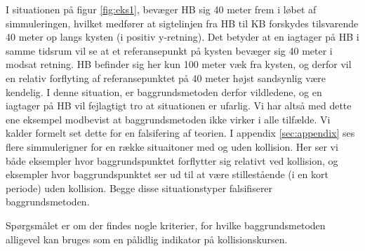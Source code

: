 \documentclass[%
 reprint,
nofootinbib,
aps,
]{revtex4-1}
\begin{document}
I situationen på figur \ref{fig:eks1}, bevæger HB sig 40 meter frem i løbet af simmuleringen, hvilket medfører at sigtelinjen fra HB til KB forskydes tilsvarende 40 meter op langs kysten (i positiv y-retning). Det betyder at en iagtager på HB i samme tidsrum vil se at et referansepunkt på kysten bevæger sig 40 meter i modsat retning. HB befinder sig her kun 100 meter væk fra kysten, og derfor vil en relativ forflyting af referansepunktet på 40 meter højst sandsynlig være kendelig. I denne situation, er baggrundsmetoden derfor vildledene, og en iagtager på HB vil fejlagtigt tro at situationen er ufarlig. Vi har altså med dette ene eksempel modbevist at baggrundsmetoden ikke virker i alle tilfælde. Vi kalder formelt set dette for en falsifering af teorien. I appendix \ref{sec:appendix} ses flere simmulerigner for en række situaitoner med og uden kollision. Her ser vi både eksempler hvor baggrundspunktet forflytter sig relativt ved kollision, og eksempler hvor baggrundspunktet ser ud til at være stillestående (i en kort periode) uden kollision. Begge disse situationstyper falsifiserer baggrundsmetoden. \par
Spørgsmålet er om der findes nogle kriterier, for hvilke baggrundsmetoden alligevel kan bruges som en pålidlig indikator på kollisionskursen.
\end{document}
